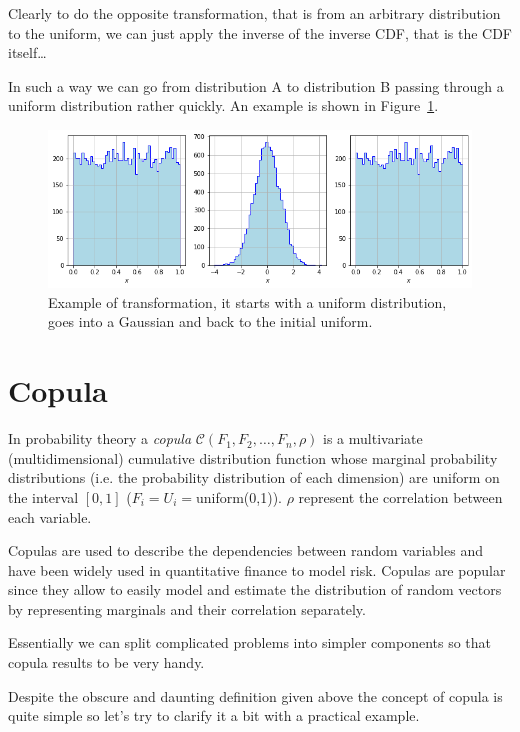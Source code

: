 Clearly to do the opposite transformation, that is from an arbitrary distribution
to the uniform, we can just apply the inverse of the inverse CDF, that is the CDF itself\ldots

In such a way we can go from distribution A to distribution B passing through 
a uniform distribution rather quickly. An example is shown in Figure~\ref{fig:a_to_b_to_a}.

\begin{figure}[htbp]
	\centering
	\includegraphics[width=1.\textwidth]{figures/lesson6_11_0.png}
	\caption{Example of transformation, it starts with a uniform distribution, goes into a Gaussian and back to the initial uniform.}
	\label{fig:a_to_b_to_a}
\end{figure}

\section{Copula}\label{copula}

In probability theory a \emph{copula} $\mathcal{C}(F_1, F_2, \ldots, F_n, \rho)$
is a multivariate (multidimensional) cumulative distribution function
whose marginal probability distributions (i.e. the probability
distribution of each dimension) are uniform on the
interval \([0, 1]\) (\(F_i = U_i =\)uniform(0,1)).
\(\rho\) represent the correlation between each variable.

Copulas are used to describe the dependencies between random variables and
have been widely used in quantitative finance to model risk. Copulas are popular since
they allow to easily model and estimate the distribution of random
vectors by representing marginals and their correlation separately.

Essentially we can split complicated problems into simpler components so that copula results to be very handy.

Despite the obscure and daunting definition given above the concept of copula is
quite simple so let's try to clarify it a bit with a practical example.

